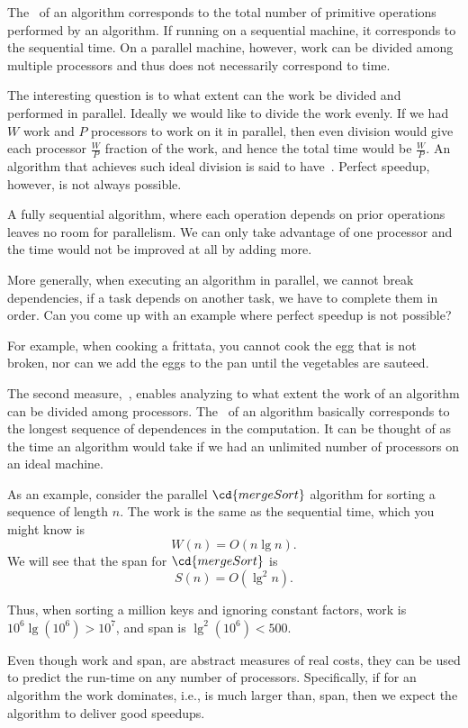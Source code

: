 The~ of an algorithm corresponds to the total number of
primitive operations performed by an algorithm.  If running on a
sequential machine, it corresponds to the sequential time.
%
On a parallel machine, however, work can be divided among multiple
processors and thus does not necessarily correspond to time.
%

The interesting question is to what extent can the work be divided and
performed in parallel.  Ideally we would like to divide the work
evenly.  If we had $W$ work and $P$ processors to work on it in
parallel, then even division would give each processor $\frac{W}{P}$
fraction of the work, and hence the total time would be $\frac{W}{P}$.
%
An algorithm that achieves such ideal division is said to
have~.  Perfect speedup, however, is not always
possible.
%

A fully sequential algorithm, where each operation depends on prior
operations leaves no room for parallelism.
%
We can only take advantage of one processor and the time would not be
improved at all by adding more.  
%

More generally, when executing an algorithm in parallel, we cannot
break dependencies, if a task depends on another task, we have to
complete them in order.
Can you come up with an example where perfect speedup is not possible?

For example, when cooking a frittata, you cannot cook the egg that is
not broken, nor can we add the eggs to the pan until the vegetables
are sauteed.

The second measure,~, enables analyzing to what extent the
work of an algorithm can be divided among processors.  The~
of an algorithm basically corresponds to the longest sequence of
dependences in the computation.  It can be thought of as the time an
algorithm would take if we had an unlimited number of processors on an
ideal machine.

As an example, consider the parallel $\cd{mergeSort}$ algorithm for
sorting a sequence of length $n$.  The work is the same as the
sequential time, which you might know is
\[
W(n) = O(n \lg{n}).
\] 
%
We will see that the span for
$\cd{mergeSort}$ is
\[
S(n) = O(\lg^2{n}).
\]

Thus, when  sorting a million keys and ignoring constant factors, 
work is $10^6\lg (10^6) > 10^7$, and 
%
span is 
$\lg^2(10^6) < 500.$
%

Even though work and span, are abstract measures of real costs, they
can be used to predict the run-time on any number of processors.
%
Specifically, if for an algorithm the work dominates, i.e., is much
larger than, span, then we expect the algorithm to deliver good
speedups.

